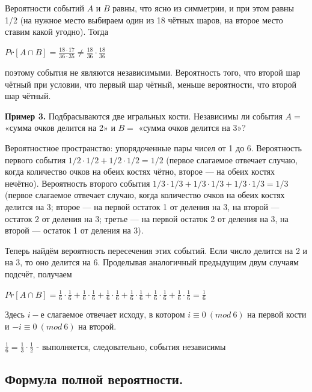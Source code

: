 \documentclass[a4paper, 10pt]{article}
\begin{document}
Вероятности событий $A$ и $B$ равны, что ясно из симметрии, и при этом равны 1/2 (на нужное место выбираем один из 18 чётных шаров, на второе место ставим какой угодно). Тогда

\begin{center}
    $\displaystyle Pr[A \cap B] = \frac{18 \cdot 17}{36 \cdot 35} \neq \frac{18}{36} \cdot \frac{18}{36}$
\end{center}

поэтому события не являются независимыми. Вероятность того, что второй шар чётный при условии, что первый шар чётный, меньше вероятности, что второй шар чётный.

\medskip

\textbf{Пример 3.} Подбрасываются две игральных кости. Независимы ли события $A =$ «сумма очков делится на 2» и $B =$ «сумма очков делится на 3»?

Вероятностное пространство: упорядоченные пары чисел от 1 до 6. Вероятность первого события $1/2 \cdot 1/2 + 1/2 \cdot 1/2 = 1/2$ (первое слагаемое отвечает случаю, когда количество очков на обеих костях чётно, второе — на обеих костях нечётно). Вероятность второго события $1/3 \cdot 1/3 + 1/3 \cdot 1/3 + 1/3 \cdot 1/3 = 1/3$ (первое слагаемое отвечает случаю, когда количество очков на обеих костях делится на 3; второе — на первой остаток 1 от деления на 3, на второй — остаток 2 от деления на 3; третье — на первой остаток 2 от деления на 3, на второй — остаток 1 от деления на 3).

Теперь найдём вероятность пересечения этих событий. Если число делится на 2 и на 3, то оно делится на 6. Проделывая аналогичный предыдущим двум случаям подсчёт, получаем

\begin{center}
    $\displaystyle Pr[A \cap B] = \frac{1}{6} \cdot \frac{1}{6} + \frac{1}{6} \cdot \frac{1}{6} + \frac{1}{6} \cdot \frac{1}{6} + \frac{1}{6} \cdot \frac{1}{6} + \frac{1}{6} \cdot \frac{1}{6} + \frac{1}{6} \cdot \frac{1}{6} = \frac{1}{6}$
\end{center}

Здесь $i-$е слагаемое отвечает исходу, в котором $i \equiv 0 \ (mod \ 6)$ на первой кости и $-i \equiv 0 \ (mod \ 6)$ на второй.

$\frac{1}{6} = \frac{1}{3} \cdot \frac{1}{2}$ - выполняется, следовательно, события независимы

\subsection{Формула полной вероятности.}
\end{document}

